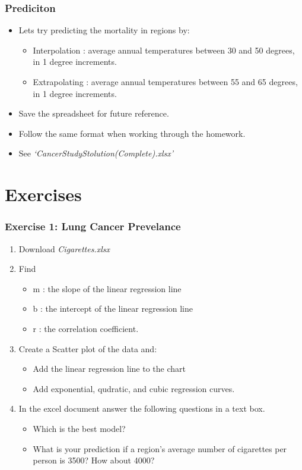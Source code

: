 \documentclass[12pt]{beamer}
\begin{document}
	\begin{frame}
		\frametitle{Prediciton}
		\begin{itemize}
			\item Lets try predicting the mortality in regions by:
				\begin{itemize}
					\item Interpolation :  average annual temperatures between 30 and 50 degrees, in 1 degree increments. 
					\item Extrapolating : average annual temperatures between 55 and 65 degrees, in 1 degree increments. 
				\end{itemize}
			\item Save the spreadsheet for future reference.
			\item Follow the same format when working through the homework.
			\item See \textit{`CancerStudyStolution(Complete).xlsx'} 
		\end{itemize}
	\end{frame}
\section{Exercises}
	\begin{frame}
		\frametitle{Exercise 1: Lung Cancer Prevelance}
		\begin{enumerate}
			\item Download \textit{Cigarettes.xlsx}
			\item Find
				\begin{itemize}
					\item m : the slope of the linear regression line
					\item b : the intercept of the linear regression line
					\item r : the correlation coefficient.
				\end{itemize}
			\item Create a Scatter plot of the data and:
			\begin{itemize}
				\item Add the linear regression line to the chart
				\item Add exponential, qudratic, and cubic regression curves.
			\end{itemize}
			\item In the excel document answer the following questions in a text box.
			\begin{itemize}
				\item Which is the best model?
				\item What is your prediction if a region's average number of cigarettes per person is 3500? How about 4000?
			\end{itemize}
		\end{enumerate} 
	\end{frame}
\end{document}
